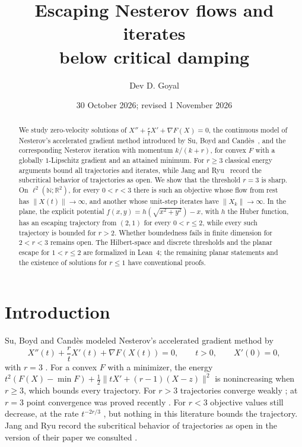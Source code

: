 \documentclass[11pt]{article}
\title{Escaping Nesterov flows and iterates\\ below critical damping}
\author{Dev D. Goyal}
\date{30 October 2026; revised 1 November 2026}
\numberwithin{equation}{section}
\theoremstyle{definition}
\theoremstyle{remark}
\newcommand{\R}{\mathbb R}
\newcommand{\N}{\mathbb N}
\newcommand{\norm}[1]{\lVert #1\rVert}
\begin{document}
\maketitle

\begin{abstract}
We study zero-velocity solutions of $X''+\frac rtX'+\nabla F(X)=0$, the continuous model of Nesterov's accelerated gradient method introduced by Su, Boyd and Cand\`es~\cite{SBC}, and the corresponding Nesterov iteration with momentum $k/(k+r)$, for convex $F$ with a globally $1$-Lipschitz gradient and an attained minimum. For $r\ge3$ classical energy arguments bound all trajectories and iterates, while Jang and Ryu~\cite{JangRyu} record the subcritical behavior of trajectories as open. We show that the threshold $r=3$ is sharp. On $\ell^2(\N;\R^2)$, for every $0<r<3$ there is such an objective whose flow from rest has $\norm{X(t)}\to\infty$, and another whose unit-step iterates have $\norm{X_k}\to\infty$. In the plane, the explicit potential $f(x,y)=h(\sqrt{x^2+y^2})-x$, with $h$ the Huber function, has an escaping trajectory from $(2,1)$ for every $0<r\le2$, while every such trajectory is bounded for $r>2$. Whether boundedness fails in finite dimension for $2<r<3$ remains open. The Hilbert-space and discrete thresholds and the planar escape for $1<r\le2$ are formalized in Lean~4; the remaining planar statements and the existence of solutions for $r\le1$ have conventional proofs.
\end{abstract}

\tableofcontents

\section{Introduction}
Su, Boyd and Cand\`es modeled Nesterov's accelerated gradient method by
\begin{equation}\label{eq:ode}
X''(t)+\frac rtX'(t)+\nabla F(X(t))=0,\qquad t>0,\qquad X'(0)=0,
\end{equation}
with $r=3$ \cite{SBC}. For a convex $F$ with a minimizer, the energy $t^2(F(X)-\min F)+\frac12\norm{tX'+(r-1)(X-z)}^2$ is nonincreasing when $r\ge3$, which bounds every trajectory. For $r>3$ trajectories converge weakly \cite{ACPR,May}; at $r=3$ point convergence was proved recently \cite{JangRyu,BFN}. For $r<3$ objective values still decrease, at the rate $t^{-2r/3}$ \cite{ACR,AAD}, but nothing in this literature bounds the trajectory. Jang and Ryu record the subcritical behavior of trajectories as open in the version of their paper we consulted \cite{JangRyu}.
\end{document}

